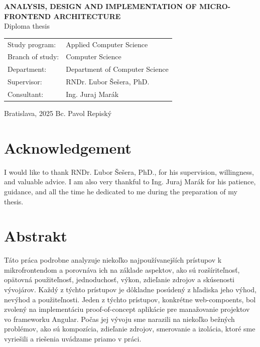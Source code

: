 \documentclass[12pt, oneside]{book}  %
\def\mfrok{2025}
\def\mftitle{Analysis, Design and Implementation of Micro-frontend Architecture}
\def\mfauthor{Bc. Pavol Repiský}
\def\mfskolitel{RNDr. Ľubor Šešera, PhD.}
\def\mfkonzultant{Ing. Juraj Marák}
\def\mfmiestocas{Bratislava, \mfrok}
\def\mftypprace{Diploma thesis}
\def\mfodbor{Computer Science}
\def\program{Applied Computer Science}
\def\mfpracovisko{Department of Computer Science}
\begin{document}
\begin{center}
	\textbf{\MakeUppercase{\Large\mftitle}}\\
	\mftypprace
\end{center}
\vfill


\begin{tabular}{l l}
Study program: & \program \\
Branch of study: & \mfodbor \\
Department: & \mfpracovisko \\
Supervisor: & \mfskolitel \\
Consultant: & \mfkonzultant \\
\end{tabular}

\vfill
\noindent
\mfmiestocas \hfill
\mfauthor
\cleardoublepage




\newpage
\setcounter{page}{2}




\newpage
\thispagestyle{empty}
\chapter*{Acknowledgement}\label{chap:thank_you}
I would like to thank RNDr. Ľubor Šešera, PhD., for his supervision, willingness, and valuable advice. I am also very thankful to Ing. Juraj Marák for his patience, guidance, and all the time he dedicated to me during the preparation of my thesis.

\vfill\eject 

\newpage 
\thispagestyle{empty}
\chapter*{Abstrakt}\label{chap:abstract_sk}
Táto práca podrobne analyzuje niekoľko najpoužívanejších prístupov k mikrofrontendom a porovnáva ich na základe aspektov, ako sú rozšíriteľnosť, opätovná použiteľnosť, jednoduchosť, výkon, zdieľanie zdrojov a skúsenosti vývojárov. Každý z týchto prístupov je dôkladne posúdený z hľadiska jeho výhod, nevýhod a použiteľnosti. Jeden z týchto prístupov, konkrétne web-compoents, bol zvolený na implementáciu proof-of-concept aplikácie pre manažovanie projektov vo frameworku Angular. Počas jej vývoju sme narazili na niekoľko bežných problémov, ako sú kompozícia, zdieľanie zdrojov, smerovanie a izolácia, ktoré sme vyriešili a riešenia uvádzame priamo v práci. \\
\end{document}

